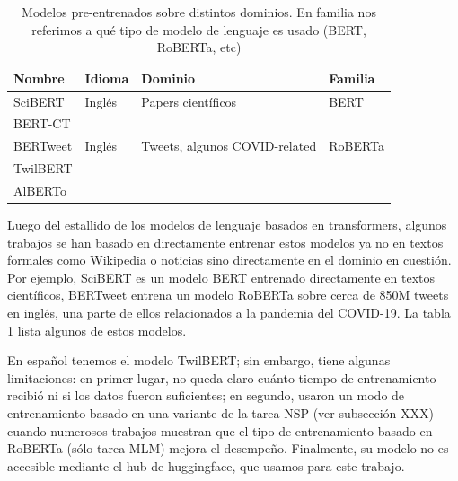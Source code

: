 \begin{table}
    \centering
    \begin{tabular}{llll}
        Nombre                                 & Idioma            & Dominio                          & Familia     \\
        \hline
        SciBERT\cite{beltagy-etal-2019-scibert}& Inglés            & Papers científicos               & BERT        \\
        BERT-CT                                &                   &                                  &             \\
        BERTweet\cite{bertweet}                & Inglés            & Tweets, algunos COVID-related    & RoBERTa     \\
        TwilBERT                               &                   &                                  &             \\
        AlBERTo                                &                   &                                  &             \\
    \end{tabular}

    \caption{Modelos pre-entrenados sobre distintos dominios. En familia nos referimos a qué tipo de modelo de lenguaje es usado (BERT, RoBERTa, etc)}
    \label{tab:bert_pretrained_models}
\end{table}


Luego del estallido de los modelos de lenguaje basados en transformers, algunos trabajos se han basado en directamente entrenar estos modelos ya no en textos formales como Wikipedia o noticias sino directamente en el dominio en cuestión. Por ejemplo, SciBERT \cite{beltagy-etal-2019-scibert} es un modelo BERT entrenado directamente en textos científicos, BERTweet \cite{bertweet} entrena un modelo RoBERTa\cite{liu2019roberta} sobre cerca de 850M tweets en inglés, una parte de ellos relacionados a la pandemia del COVID-19. La tabla \ref{tab:bert_pretrained_models} lista algunos de estos modelos.

En español tenemos el modelo TwilBERT\cite{gonzalez2021twilbert}; sin embargo, tiene algunas limitaciones: en primer lugar, no queda claro cuánto tiempo de entrenamiento recibió ni si los datos fueron suficientes; en segundo, usaron un modo de entrenamiento basado en una variante de la tarea NSP (ver subsección XXX) cuando numerosos trabajos muestran que el tipo de entrenamiento basado en RoBERTa (sólo tarea MLM) mejora el desempeño. Finalmente, su modelo no es accesible mediante el hub de huggingface, que usamos para este trabajo.


